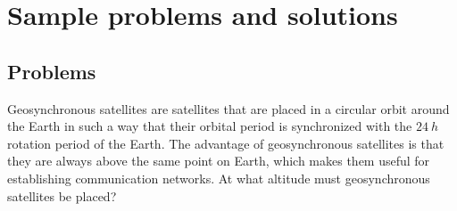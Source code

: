 \newpage
\section{Sample problems and solutions}
\subsection{Problems}
\begin{problem}{\label{prob:gravity:geosyncorbit}Geosynchronous satellites are satellites that are placed in a circular orbit around the Earth in such a way that their orbital period is synchronized with the $\SI{24}{h}$ rotation period of the Earth. The advantage of geosynchronous satellites is that they are always above the same point on Earth, which makes them useful for establishing communication networks. At what altitude must geosynchronous satellites be placed?}
\end{problem}

\newpage
